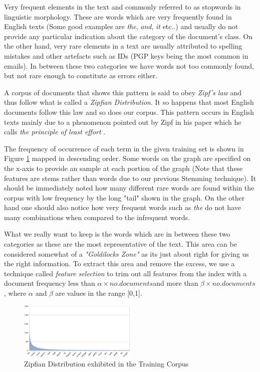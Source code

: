 Very frequent elements in the text and commonly referred to as stopwords in linguistic morphology. These are words which are very frequently found in English texts (Some good examples are \emph{the}, \emph{and}, \emph{it} etc..) and usually do not provide any particular indication about the category of the document's class. On the other hand, very rare elements in a text are usually attributed to spelling mistakes and other artefacts such as IDs (PGP keys being the most common in emails). In between these two categories we have words not too commonly found, but not rare enough to constitute as errors either.

A corpus of documents that shows this pattern is said to obey \emph{Zipf's law} and thus follow what is called a \emph{Zipfian Distribution}. It so happens that most English documents follow this law and so does our corpus. This pattern occurs in English texts mainly due to a phenomenon pointed out by Zipf in his paper which he calls  \emph{the principle of least effort} \cite{zipf1949}.

The frequency of occurrence of each term in the given training set is shown in Figure \ref{zipfian} mapped in descending order. Some words on the graph are specified on the x-axis to provide an sample at each portion of the graph (Note that these features are stems rather than words due to our previous Stemming technique). It should be immediately noted how many different rare words are found within the corpus with low frequency by the long "tail" shown in the graph. On the other hand one should also notice how very frequent words such as \emph{the} do not have many combinations when compared to the infrequent words.

What we really want to keep is the words which are in between these two categories as these are the most representative of the text. This area can be considered somewhat of a \emph{"Goldilocks Zone"} as its just about right for giving us the right information. To extract this area and remove the excess, we use a technique called \textit{feature selection} to trim out all features from the index with a document frequency less than \(\alpha \times no. documents\)and more than \(\beta \times no. documents\), where \(\alpha\) and \(\beta\) are values in the range [0,1].

\begin{figure}[h!]
	\label{zipfian}
    \centering
    \includegraphics[width=0.5\textwidth]{zipfian.png}
    \caption{Zipfian Distribution exhibited in the Training Corpus}
    \label{zipfian}
\end{figure}

